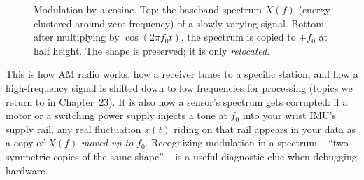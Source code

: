 \begin{figure}[H]
\centering
{}

\caption{Modulation by a cosine. Top: the baseband spectrum $X(f)$ (energy clustered
around zero frequency) of a slowly varying signal. Bottom: after multiplying by $\cos(2\pi f_0 t)$, the spectrum is
copied to $\pm f_0$ at half height. The shape is preserved; it is only
\emph{relocated}.}
\label{ch11:fig-modulation}
\end{figure}

\begin{applicationbox}
This is how AM radio works, how a receiver tunes to a specific station, and how a high-frequency signal is shifted down to low frequencies for processing (topics we return to in Chapter~23). It
is also how a sensor's spectrum gets corrupted: if a motor or a switching power
supply injects a tone at $f_0$ into your wrist IMU's supply rail, any real
fluctuation $x(t)$ riding on that rail appears in your data as a copy of $X(f)$
\emph{moved up to} $f_0$. Recognizing modulation in a spectrum -- ``two
symmetric copies of the same shape'' -- is a useful diagnostic clue when debugging hardware.
\end{applicationbox}

